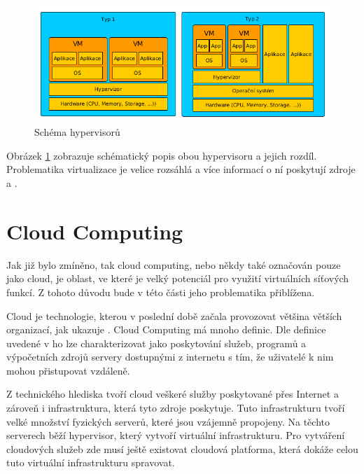 \begin{figure}[h]
\begin{centering}
\includegraphics[scale=0.5]{images/virtualization}
\par\end{centering}
\caption{Schéma hypervisorů \label{fig:virtualization}}
\end{figure}

Obrázek \ref{fig:virtualization} zobrazuje schématický popis obou hypervisoru a jejich rozdíl. Problematika virtualizace je velice rozsáhlá a více informací o ní poskytují zdroje \cite{VM_book} a \cite{VM_architektura}.

\section{Cloud Computing}

Jak již bylo zmíněno, tak cloud computing, nebo někdy také označován pouze jako cloud, je oblast, ve které je velký potenciál pro využití virtuálních síťových funkcí. Z tohoto důvodu bude v této části jeho problematika přiblížena.

Cloud je technologie, kterou v poslední době začala provozovat většina větších organizací, jak ukazuje \cite{Cloud_adoption}. Cloud Computing má mnoho definic. Dle definice uvedené v \cite{Cloud_book} ho lze charakterizovat jako poskytování služeb, programů a výpočetních zdrojů servery dostupnými z internetu s tím, že uživatelé k nim mohou přistupovat vzdáleně.

Z technického hlediska tvoří cloud veškeré služby poskytované přes Internet a zároveň i infrastruktura, která tyto zdroje poskytuje. Tuto infrastrukturu tvoří velké množství fyzických serverů, které jsou vzájemně propojeny. Na těchto serverech běží hypervisor, který vytvoří virtuální infrastrukturu. Pro vytváření cloudových služeb zde musí ještě existovat cloudová platforma, která dokáže celou tuto virtuální infrastrukturu spravovat. \cite{Cloud_book}

